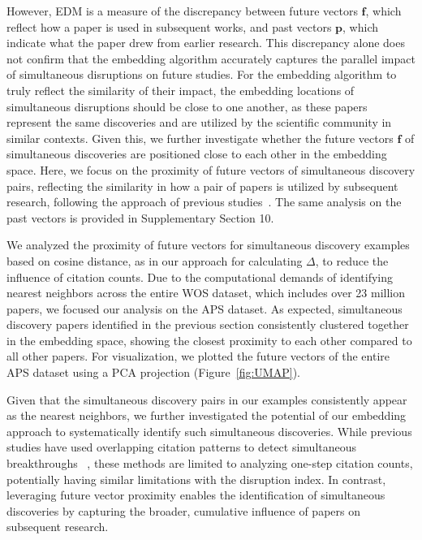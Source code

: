 \documentclass[12pt]{article}
\begin{document}
However, EDM is a measure of the discrepancy between future vectors $\mathbf{f}$, which reflect how a paper is used in subsequent works, and past vectors $\mathbf{p}$, which indicate what the paper drew from earlier research. This discrepancy alone does not confirm that the embedding algorithm accurately captures the parallel impact of simultaneous disruptions on future studies. For the embedding algorithm to truly reflect the similarity of their impact, the embedding locations of simultaneous disruptions should be close to one another, as these papers represent the same discoveries and are utilized by the scientific community in similar contexts. Given this, we further investigate whether the future vectors $\mathbf{f}$ of simultaneous discoveries are positioned close to each other in the embedding space. Here, we focus on the proximity of future vectors of simultaneous discovery pairs, reflecting the similarity in how a pair of papers is utilized by subsequent research, following the approach of previous studies~\cite{bikard2020idea,painter2020quantifying,small1973co}. The same analysis on the past vectors is provided in Supplementary Section 10.



We analyzed the proximity of future vectors for simultaneous discovery examples based on cosine distance, as in our approach for calculating $\Delta$, to reduce the influence of citation counts. Due to the computational demands of identifying nearest neighbors across the entire WOS dataset, which includes over 23 million papers, we focused our analysis on the APS dataset. As expected, simultaneous discovery papers identified in the previous section consistently clustered together in the embedding space, showing the closest proximity to each other compared to all other papers. For visualization, we plotted the future vectors of the entire APS dataset using a PCA projection (Figure~\ref{fig:UMAP}).

Given that the simultaneous discovery pairs in our examples consistently appear as the nearest neighbors, we further investigated the potential of our embedding approach to systematically identify such simultaneous discoveries. While previous studies have used overlapping citation patterns to detect simultaneous breakthroughs ~\cite{bikard2020idea,painter2020quantifying,small1973co}, these methods are limited to analyzing one-step citation counts, potentially having similar limitations with the disruption index. In contrast, leveraging future vector proximity enables the identification of simultaneous discoveries by capturing the broader, cumulative influence of papers on subsequent research. 
\end{document}
